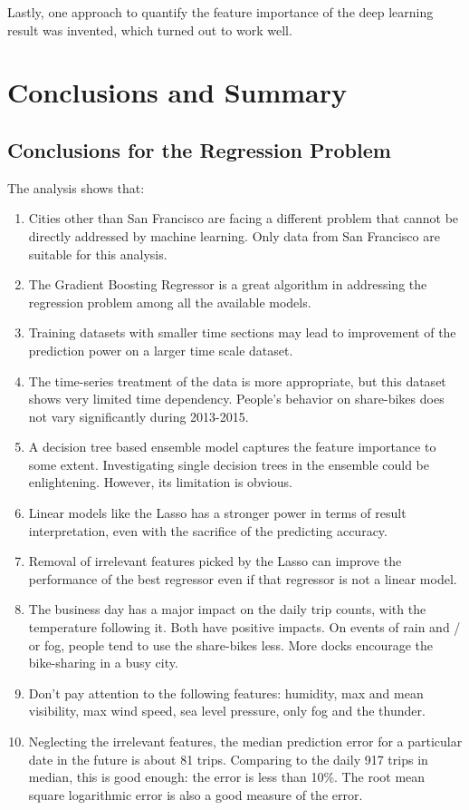 \documentclass[a4paper]{article}
\begin{document}
			Lastly, one approach to quantify the feature importance of the deep learning result was invented, which turned out to work well.
			
\clearpage	

	\section{Conclusions and Summary}
	
	\subsection{Conclusions for the Regression Problem}
	The analysis shows that:
	\begin{enumerate}
		\item Cities other than San Francisco are facing a different problem that cannot be directly addressed by machine learning. Only data from San Francisco are suitable for this analysis.
		\item The Gradient Boosting Regressor is a great algorithm in addressing the regression problem among all the available models.
		\item Training datasets with smaller time sections may lead to improvement of the prediction power on a larger time scale dataset.
		\item The time-series treatment of the data is more appropriate, but this dataset shows very limited time dependency. People's behavior on share-bikes does not vary significantly during 2013-2015.
		\item A decision tree based ensemble model captures the feature importance to some extent. Investigating single decision trees in the ensemble could be enlightening. However, its limitation is obvious.
		\item Linear models like the Lasso has a stronger power in terms of result interpretation, even with the sacrifice of the predicting accuracy. 
		\item Removal of irrelevant features picked by the Lasso can improve the performance of the best regressor even if that regressor is not a linear model.
		\item The business day has a major impact on the daily trip counts, with the temperature following it. Both have positive impacts. On events of rain and / or fog, people tend to use the share-bikes less. More docks encourage the bike-sharing in a busy city.
		\item Don't pay attention to the following features: humidity, max and mean visibility, max wind speed, sea level pressure, only fog and the thunder.
		\item Neglecting the irrelevant features, the median prediction error for a particular date in the future is about 81 trips. Comparing to the daily 917 trips in median, this is good enough: the error is less than 10\%. The root mean square logarithmic error is also a good measure of the error.
	\end{enumerate} 
	
\end{document}
